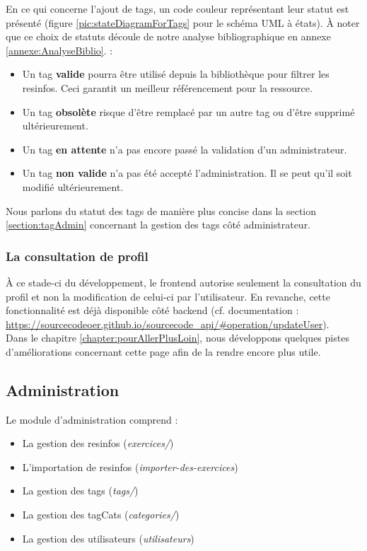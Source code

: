 En ce qui concerne l'ajout de \glspl{tag}, un code couleur représentant leur statut est présenté (figure \ref{pic:stateDiagramForTags} pour le schéma UML à états). À noter que ce choix de statuts découle de notre analyse bibliographique en annexe \ref{annexe:AnalyseBiblio}. :

\begin{itemize}
    \item Un \gls{tag} \textbf{valide} pourra être utilisé depuis la bibliothèque pour filtrer les \glspl{resinfo}. Ceci garantit un meilleur référencement pour la ressource.
    \item Un \gls{tag} \textbf{obsolète} risque d'être remplacé par un autre \gls{tag} ou d'être supprimé ultérieurement.
    \item Un \gls{tag} \textbf{en attente} n'a pas encore passé la validation d'un administrateur.
    \item Un \gls{tag} \textbf{non valide} n'a pas été accepté l'administration. Il se peut qu'il soit modifié ultérieurement.
\end{itemize}

Nous parlons du statut des \glspl{tag} de manière plus concise dans la section \ref{section:tagAdmin} concernant la gestion des \glspl{tag} côté administrateur.

\subsubsection{La consultation de profil}

À ce stade-ci du développement, le \gls{frontend} autorise seulement la consultation du profil et non la modification de celui-ci par l'utilisateur. En revanche, cette fonctionnalité est déjà disponible côté backend (cf. documentation : \url{https://sourcecodeoer.github.io/sourcecode_api/#operation/updateUser}).\\

Dans le chapitre \ref{chapter:pourAllerPlusLoin}, nous développons quelques pistes d'améliorations concernant cette page afin de la rendre encore plus utile.

\subsection{Administration}

Le module d'administration comprend :

\begin{itemize}
    \item La gestion des \glspl{resinfo} (\textit{exercices/})
    \item L'importation de \glspl{resinfo} (\textit{importer-des-exercices})
    \item La gestion des \glspl{tag} (\textit{tags/})
    \item La gestion des \glspl{tagCat} (\textit{categories/})
    \item La gestion des utilisateurs (\textit{utilisateurs})
\end{itemize}

